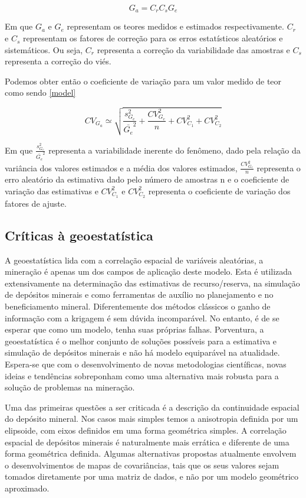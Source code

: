  
  \begin{equation} \label{modelo_corr}
  G_{a} = C_{r}C_{s}G_{e}
  \end{equation}
  
  Em que $G_{a}$ e $G_{e}$ representam os teores medidos e estimados respectivamente. $C_{r}$ e $C_{s}$ representam os fatores de correção para os erros estatísticos aleatórios e sistemáticos. Ou seja, $C_{r}$ representa a correção da variabilidade das amostras e $C_{s}$ representa a correção do viés. 
  
  Podemos obter então o coeficiente de variação para um valor medido de teor como sendo \eqref{model}
  
  \begin{equation}\label{model}
  	  CV_{G_{a}} \simeq \sqrt{ \frac{s^2_{G_{e}}}{\bar{G_{e}}^2} + \frac{CV^2_{G_{e}}}{n} + CV^2_{C_{1}} +CV^2_{C_{2}}}
  \end{equation}
 
 Em que $\frac{s^2_{G_{e}}}{\bar{G_{e}}^2}$ representa a variabilidade inerente do fenômeno, dado pela relação da variância dos valores estimados e a média dos valores estimados, $\frac{CV^2_{G_{e}}}{n}$ representa o erro aleatório da estimativa dado pelo número de amostras n e o coeficiente de variação das estimativas e $CV^2_{C_{1}}$ e $CV^2_{C_{2}}$ representa o coeficiente de variação dos fatores de ajuste. 
 
 
 \subsection{Críticas à geoestatística}
 
 A geoestatística lida com a correlação espacial de variáveis aleatórias, a mineração é apenas um dos campos de aplicação deste modelo. Esta é utilizada extensivamente na determinação das estimativas de recurso/reserva, na simulação de depósitos minerais e como ferramentas de auxílio no planejamento e no beneficiamento mineral. Diferentemente dos métodos clássicos o ganho de informação com a krigagem é sem dúvida incomparável. No entanto, é de se esperar que como um modelo, tenha suas próprias falhas. Porventura, a geoestatística é o melhor conjunto de soluções possíveis para a estimativa e simulação de depósitos minerais e não há modelo equiparável na atualidade. Espera-se que com o desenvolvimento de novas metodologias científicas, novas ideias e tendências sobreponham como uma alternativa mais robusta para a solução de problemas na mineração.  
 
 Uma das primeiras questões a ser criticada é a descrição da continuidade espacial do depósito mineral. Nos casos mais simples temos a anisotropia definida por um elipsoide, com eixos definidos em uma forma geométrica simples. A correlação espacial de depósitos minerais é naturalmente mais errática e diferente de uma forma geométrica definida. Algumas alternativas propostas atualmente envolvem o desenvolvimentos de mapas de covariâncias, tais que os seus valores sejam tomados diretamente por uma matriz de dados, e não por um modelo geométrico aproximado. 
 
